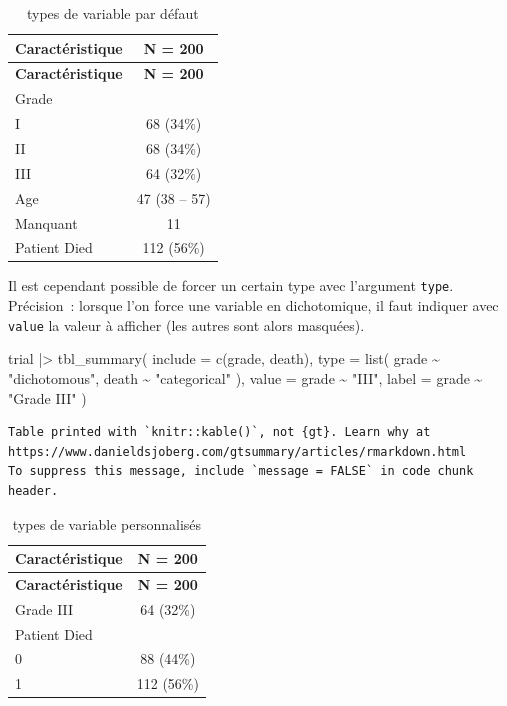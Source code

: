 \documentclass[
  letterpaper,
  DIV=11,
  numbers=noendperiod,
  oneside]{scrreprt}
\newenvironment{Shaded}{\begin{snugshade}}{\end{snugshade}}
\newcommand{\AttributeTok}[1]{\textcolor[rgb]{0.40,0.45,0.13}{#1}}
\newcommand{\FunctionTok}[1]{\textcolor[rgb]{0.28,0.35,0.67}{#1}}
\newcommand{\NormalTok}[1]{\textcolor[rgb]{0.00,0.23,0.31}{#1}}
\newcommand{\SpecialCharTok}[1]{\textcolor[rgb]{0.37,0.37,0.37}{#1}}
\newcommand{\StringTok}[1]{\textcolor[rgb]{0.13,0.47,0.30}{#1}}
\begin{document}
\hypertarget{tbl-types-defaut}{}
\begin{longtable}[]{@{}lc@{}}
\caption{\label{tbl-types-defaut}types de variable par
défaut}\tabularnewline
\toprule()
\textbf{Caractéristique} & \textbf{N = 200} \\
\midrule()
\endfirsthead
\toprule()
\textbf{Caractéristique} & \textbf{N = 200} \\
\midrule()
\endhead
Grade & \\
I & 68 (34\%) \\
II & 68 (34\%) \\
III & 64 (32\%) \\
Age & 47 (38 -- 57) \\
Manquant & 11 \\
Patient Died & 112 (56\%) \\
\bottomrule()
\end{longtable}

Il est cependant possible de forcer un certain type avec l'argument
\texttt{type}. Précision~: lorsque l'on force une variable en
dichotomique, il faut indiquer avec \texttt{value} la valeur à afficher
(les autres sont alors masquées).

\begin{Shaded}
\begin{Highlighting}[]
\NormalTok{trial }\SpecialCharTok{|\textgreater{}}
  \FunctionTok{tbl\_summary}\NormalTok{(}
    \AttributeTok{include =} \FunctionTok{c}\NormalTok{(grade, death),}
    \AttributeTok{type =} \FunctionTok{list}\NormalTok{(}
\NormalTok{      grade }\SpecialCharTok{\textasciitilde{}} \StringTok{"dichotomous"}\NormalTok{,}
\NormalTok{      death }\SpecialCharTok{\textasciitilde{}} \StringTok{"categorical"}
\NormalTok{    ),}
    \AttributeTok{value =}\NormalTok{ grade }\SpecialCharTok{\textasciitilde{}} \StringTok{"III"}\NormalTok{,}
    \AttributeTok{label =}\NormalTok{ grade }\SpecialCharTok{\textasciitilde{}} \StringTok{"Grade III"}
\NormalTok{  )}
\end{Highlighting}
\end{Shaded}

\begin{verbatim}
Table printed with `knitr::kable()`, not {gt}. Learn why at
https://www.danieldsjoberg.com/gtsummary/articles/rmarkdown.html
To suppress this message, include `message = FALSE` in code chunk header.
\end{verbatim}

\hypertarget{tbl-types-personnalises}{}
\begin{longtable}[]{@{}lc@{}}
\caption{\label{tbl-types-personnalises}types de variable
personnalisés}\tabularnewline
\toprule()
\textbf{Caractéristique} & \textbf{N = 200} \\
\midrule()
\endfirsthead
\toprule()
\textbf{Caractéristique} & \textbf{N = 200} \\
\midrule()
\endhead
Grade III & 64 (32\%) \\
Patient Died & \\
0 & 88 (44\%) \\
1 & 112 (56\%) \\
\bottomrule()
\end{longtable}
\end{document}
